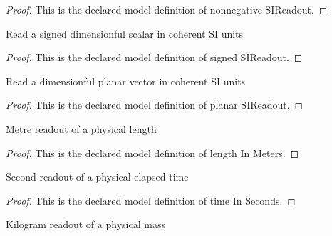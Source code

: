 \begin{proof}
  This is the declared model definition of nonnegative SIReadout.
\end{proof}
\begin{definition}
  \label{def:physics:phyx-mini-0837:phyxminiproblems-problemphyxmini0837-signedsireadout}
  Read a signed dimensionful scalar in coherent SI units
\end{definition}
\begin{proof}
  This is the declared model definition of signed SIReadout.
\end{proof}
\begin{definition}
  \label{def:physics:phyx-mini-0837:phyxminiproblems-problemphyxmini0837-planarsireadout}
  Read a dimensionful planar vector in coherent SI units
\end{definition}
\begin{proof}
  This is the declared model definition of planar SIReadout.
\end{proof}
\begin{definition}
  \label{def:physics:phyx-mini-0837:phyxminiproblems-problemphyxmini0837-lengthinmeters}
  Metre readout of a physical length
\end{definition}
\begin{proof}
  This is the declared model definition of length In Meters.
\end{proof}
\begin{definition}
  \label{def:physics:phyx-mini-0837:phyxminiproblems-problemphyxmini0837-timeinseconds}
  Second readout of a physical elapsed time
\end{definition}
\begin{proof}
  This is the declared model definition of time In Seconds.
\end{proof}
\begin{definition}
  \label{def:physics:phyx-mini-0837:phyxminiproblems-problemphyxmini0837-massinkilograms}
  Kilogram readout of a physical mass
\end{definition}
